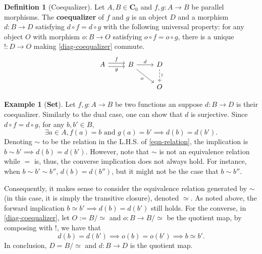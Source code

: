 \documentclass{article}
\theoremstyle{definition}
\newtheorem{defn}[thm]{Definition}
\newtheorem{exmp}[thm]{Example}
\theoremstyle{remark}
\begin{document}
\begin{defn}[Coequalizer]
    Let $A, B \in \mathbf{C}_0$ and $f,g:A\rightarrow B$ be parallel morphisms. The \textbf{coequalizer} of $f$ and $g$ is an object $D$ and a morphism $d:B\rightarrow D$ satisfying $d\circ f = d \circ g$ with the following universal property: for any object $O$ with morphism $o:B\rightarrow O$ satisfying $o\circ f = o \circ g$, there is a unique $!: D \rightarrow O$ making \eqref{diag-coequalizer} commute.
    \begin{equation}\label{diag-coequalizer}
        \begin{tikzcd}
            A \arrow[r, "f", shift left] \arrow[r, "g"', shift right] & B \arrow[r, "d"] \arrow[rd, "o"'] & D \arrow[d, "!", dashed] \\& & O
        \end{tikzcd}
    \end{equation}
\end{defn}
\begin{exmp}[\textbf{Set}]
    Let $f,g:A\rightarrow B$ be two functions an suppose $d:B \rightarrow D$ is their coequalizer. Similarly to the dual case, one can show that $d$ is surjective. Since $d\circ f = d \circ g$, for any $b, b' \in B$,
    \begin{equation}\label{eqn-relation}\tag{$*$}
        \exists a \in A, f(a) = b\text{ and } g(a) = b' \implies d(b) =d(b').
    \end{equation} Denoting $\sim$ to be the relation in the L.H.S. of \eqref{eqn-relation}, the implication is $b \sim b' \implies d(b) = d(b')$. However, note that $\sim$ is not an equivalence relation while $=$ is, thus, the converse implication does not always hold. For instance, when $b\sim b'\sim b''$, $d(b) = d(b'')$, but it might not be the case that $b\sim b''$.

    Consequently, it makes sense to consider the equivalence relation generated by $\sim$ (in this case, it is simply the transitive closure), denoted $\simeq$. As noted above, the forward implication $b\simeq b' \implies d(b)= d(b')$ still holds. For the converse, in \eqref{diag-coequalizer}, let $O:= B/{\simeq}$ and $o: B \rightarrow B/{\simeq}$ be the quotient map, by composing with $!$, we have that \[d(b) = d(b') \implies o(b) = o(b') \implies b \simeq b'.\]
    In conclusion, $D= B/{\simeq}$ and $d:B \rightarrow D$ is the quotient map.
\end{exmp}
\end{document}
